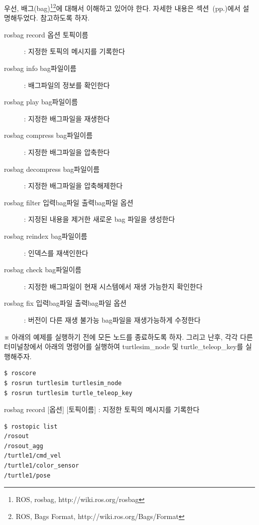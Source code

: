 우선, 배그(bag)\footnote{ROS, rosbag, http://wiki.ros.org/rosbag}\footnote{ROS, Bags Format, http://wiki.ros.org/Bags/Format}에 대해서 이해하고 있어야 한다. 자세한 내용은 섹션~(pp.\pageref{def:RosBag})에서 설명해두었다. 참고하도록 하자.

\vspace{\baselineskip}
\noindent
\begin{description}
\item[rosbag record 옵션 토픽이름] : 지정한 토픽의 메시지를 기록한다
\item[rosbag info bag파일이름] : 배그파일의 정보를 확인한다
\item[rosbag play bag파일이름] : 지정한 배그파일을 재생한다

\item[rosbag compress bag파일이름] : 지정한 배그파일을 압축한다
\item[rosbag decompress bag파일이름] : 지정한 배그파일을 압축해제한다

\item[rosbag filter 입력bag파일 출력bag파일 옵션] : 지정된 내용을 제거한 새로운 bag 파일을 생성한다
\item[rosbag reindex bag파일이름] : 인덱스를 재색인한다

\item[rosbag check bag파일이름] : 지정한 배그파일이 현재 시스템에서 재생 가능한지 확인한다
\item[rosbag fix 입력bag파일 출력bag파일 옵션] : 버전이 다른 재생 불가능 bag파일을 재생가능하게 수정한다
\end{description}

\vspace{\baselineskip}
\noindent
※ 아래의 예제를 실행하기 전에 모든 노드를 종료하도록 하자. 그리고 난후, 각각 다른 터미널창에서 아래의 명령어를 실행하여 turtlesim\_node 및 turtle\_teleop\_key를 실행해주자.

\vspace{\baselineskip}
\begin{lstlisting}[language=ROS]
$ roscore
$ rosrun turtlesim turtlesim_node 
$ rosrun turtlesim turtle_teleop_key
\end{lstlisting}

\setcounter{num}{0}

\noindent
{}\circled{\thenum} rosbag record [옵션] [토픽이름] : 지정한 토픽의 메시지를 기록한다

\begin{lstlisting}[language=ROS]
$ rostopic list
/rosout
/rosout_agg
/turtle1/cmd_vel
/turtle1/color_sensor
/turtle1/pose
\end{lstlisting}

